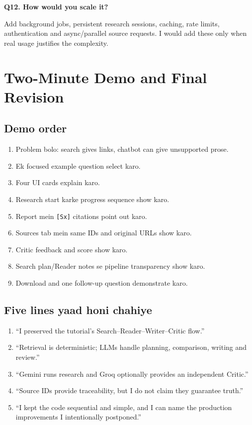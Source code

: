\documentclass[11pt,a4paper]{article}
\newcommand{\code}[1]{\texttt{#1}}
\begin{document}
\textbf{Q12. How would you scale it?}
\begin{answerbox}
Add background jobs, persistent research sessions, caching, rate limits, authentication and async/parallel source requests. I would add these only when real usage justifies the complexity.
\end{answerbox}

\section{Two-Minute Demo and Final Revision}

\subsection{Demo order}

\begin{enumerate}
  \item Problem bolo: search gives links, chatbot can give unsupported prose.
  \item Ek focused example question select karo.
  \item Four UI cards explain karo.
  \item Research start karke progress sequence show karo.
  \item Report mein \code{[Sx]} citations point out karo.
  \item Sources tab mein same IDs and original URLs show karo.
  \item Critic feedback and score show karo.
  \item Search plan/Reader notes se pipeline transparency show karo.
  \item Download and one follow-up question demonstrate karo.
\end{enumerate}

\subsection{Five lines yaad honi chahiye}

\begin{enumerate}
  \item ``I preserved the tutorial's Search--Reader--Writer--Critic flow.''
  \item ``Retrieval is deterministic; LLMs handle planning, comparison, writing and review.''
  \item ``Gemini runs research and Groq optionally provides an independent Critic.''
  \item ``Source IDs provide traceability, but I do not claim they guarantee truth.''
  \item ``I kept the code sequential and simple, and I can name the production improvements I intentionally postponed.''
\end{enumerate}
\end{document}
